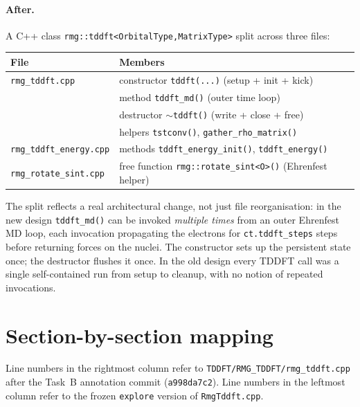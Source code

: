 \documentclass[11pt,letterpaper]{article}
\begin{document}
\paragraph{After.}  A C++ class
\texttt{rmg::tddft<OrbitalType,MatrixType>} split across three files:
\begin{center}
\begin{tabular}{ll}
\toprule
File & Members \\
\midrule
\texttt{rmg\_tddft.cpp} & constructor \texttt{tddft(...)} (setup + init + kick) \\
                       & method \texttt{tddft\_md()} (outer time loop) \\
                       & destructor \texttt{$\sim$tddft()} (write + close + free) \\
                       & helpers \texttt{tstconv()}, \texttt{gather\_rho\_matrix()} \\
\texttt{rmg\_tddft\_energy.cpp} & methods \texttt{tddft\_energy\_init()}, \texttt{tddft\_energy()} \\
\texttt{rmg\_rotate\_sint.cpp}  & free function \texttt{rmg::rotate\_sint<O>()} (Ehrenfest helper) \\
\bottomrule
\end{tabular}
\end{center}

The split reflects a real architectural change, not just file
reorganisation: in the new design \texttt{tddft\_md()} can be invoked
\emph{multiple times} from an outer Ehrenfest MD loop, each invocation
propagating the electrons for \texttt{ct.tddft\_steps} steps before
returning forces on the nuclei.  The constructor sets up the persistent
state once; the destructor flushes it once.  In the old design every TDDFT
call was a single self-contained run from setup to cleanup, with no notion
of repeated invocations.

\section{Section-by-section mapping}
\label{sec:mapping}

Line numbers in the rightmost column refer to
\texttt{TDDFT/RMG\_TDDFT/rmg\_tddft.cpp} after the Task~B annotation commit
(\texttt{a998da7c2}).  Line numbers in the leftmost column refer to the
frozen \texttt{explore} version of \texttt{RmgTddft.cpp}.
\end{document}
